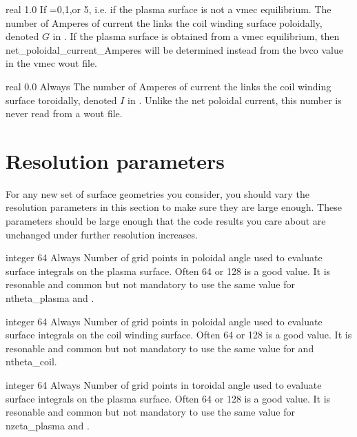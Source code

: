 \myhrule

{real}
{1.0}
{If =0,1,or 5, i.e. if the plasma surface is not a vmec equilibrium.}
{The number of Amperes of current the links the coil winding surface poloidally,
denoted $G$ in \cite{regcoilPaper}. If the plasma surface is obtained from a vmec equilibrium,
then {\ttfamily net\_poloidal\_current\_Amperes} will be determined instead
from the {\ttfamily bvco} value in the vmec wout file.
}

\myhrule

{real}
{0.0}
{Always}
{The number of Amperes of current the links the coil winding surface toroidally,
denoted $I$ in \cite{regcoilPaper}. Unlike the net poloidal current, this number
is never read from a wout file.
}



\section{Resolution parameters}

For any new set of surface geometries you consider, you should vary the resolution parameters in this section to make sure
they are large enough.  These parameters should be large enough that the code results you care about are unchanged under further
resolution increases.

\myhrule

{integer}
{64}
{Always}
{Number of grid points in poloidal angle used to evaluate surface integrals on the plasma surface.
Often 64 or 128 is a good value.
It is resonable and common but not mandatory to use the same value for {\ttfamily ntheta\_plasma} and .}

\myhrule

{integer}
{64}
{Always}
{Number of grid points in poloidal angle used to evaluate surface integrals on the coil winding surface.
Often 64 or 128 is a good value.
It is resonable and common but not mandatory to use the same value for  and {\ttfamily ntheta\_coil}.}

\myhrule


{integer}
{64}
{Always}
{Number of grid points in toroidal angle used to evaluate surface integrals on the plasma surface.
Often 64 or 128 is a good value.
It is resonable and common but not mandatory to use the same value for {\ttfamily nzeta\_plasma} and .}

